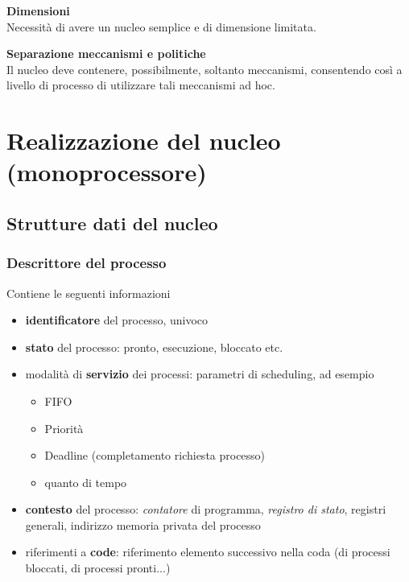 \begin{mdframed}[topline=false,bottomline=false,rightline=false]
\textbf{Dimensioni}\\
Necessità di avere un nucleo semplice e di dimensione limitata.
\end{mdframed}

\begin{mdframed}[topline=false,bottomline=false,rightline=false]
\textbf{Separazione meccanismi e politiche}\\
Il nucleo deve contenere, possibilmente, soltanto meccanismi, consentendo così a livello di processo di utilizzare tali meccanismi ad hoc.
\end{mdframed}

\section{Realizzazione del nucleo (monoprocessore)}

\subsection{Strutture dati del nucleo}

\subsubsection{Descrittore del processo}

Contiene le seguenti informazioni
\begin{itemize}
    \item \textbf{identificatore} del processo, univoco
    \item \textbf{stato} del processo: pronto, esecuzione, bloccato etc.
    \item modalità di \textbf{servizio} dei processi: parametri di scheduling, ad esempio
    \begin{itemize}
        \item FIFO
        \item Priorità
        \item Deadline (completamento richiesta processo)
        \item quanto di tempo
    \end{itemize}
    \item \textbf{contesto} del processo: \textit{contatore} di programma, \textit{registro di stato}, registri generali, indirizzo memoria privata del processo
    \item riferimenti a \textbf{code}: riferimento elemento successivo nella coda (di processi bloccati, di processi pronti...)
\end{itemize}

